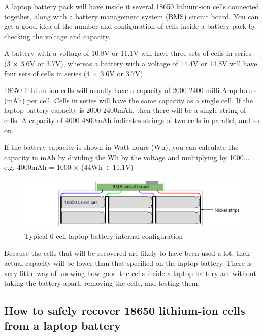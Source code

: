 \documentclass{article}
\theoremstyle{definition}
\theoremstyle{definition}
\theoremstyle{remark}
\begin{document}
    A laptop battery pack will have inside it several 18650 lithium-ion cells connected together, along with a battery management system (BMS) circuit board. You can get a good idea of the number and configuration of cells inside a battery pack by checking the voltage and capacity. 

    A battery with a voltage of 10.8V or 11.1V will have three sets of cells in series (3 \(\times\) 3.6V or 3.7V), whereas a battery with a voltage of 14.4V or 14.8V will have four sets of cells in series (4 \(\times\) 3.6V or 3.7V)

    18650 lithium-ion cells will usually have a capacity of 2000-2400 milli-Amp-hours (mAh) per cell. Cells in series will have the same capacity as a single cell. If the laptop battery capacity is 2000-2400mAh, then there will be a single string of cells. A capacity of 4000-4800mAh indicates strings of two cells in parallel, and so on.

    If the battery capacity is shown in Watt-hours (Wh), you can calculate the capacity in mAh by dividing the Wh by the voltage and multiplying by 1000... e.g. 4000mAh = 1000 \(\times\) (44Wh \(\div\) 11.1V)


    \begin{figure}[h!]
      \centering
      \includegraphics[width=0.75\paperwidth]{Images/image_5_2_(battery_configuration).png}
      \caption*{\centering Typical 6 cell laptop battery internal configuration}
    \end{figure}

    Because the cells that will be recovered are likely to have been used a lot, their actual capacity will be lower than that specified on the laptop battery. There is very little way of knowing how good the cells inside a laptop battery are without taking the battery apart, removing the cells, and testing them.
  

  \subsection{How to safely recover 18650 lithium-ion cells from a laptop battery} %
  \label{sub:how_to_safely_recover_18650_lithium_ion_cells_from_a_laptop_battery}
  
\end{document}
